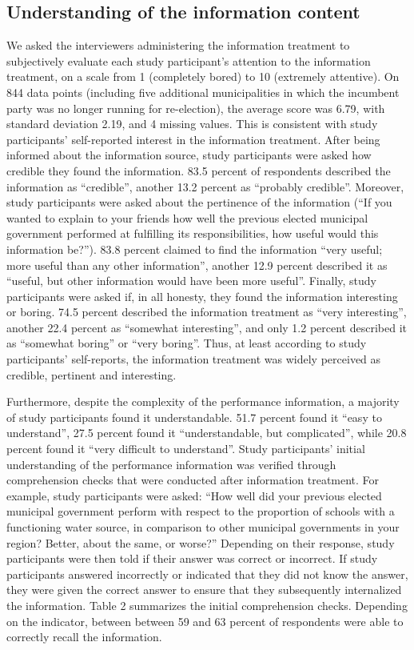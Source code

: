 \documentclass[11pt]{article}
\begin{document}
\subsection{Understanding of the information content}

We asked the interviewers administering the information treatment to subjectively evaluate each study participant's attention to the information treatment, on a scale from 1 (completely bored) to 10 (extremely attentive). On 844 data points (including five additional municipalities in which the incumbent party was no longer running for re-election), the average score was 6.79, with standard deviation 2.19, and 4 missing values. This is consistent with study participants' self-reported interest in the information treatment. After being informed about the information source, study participants were asked how credible they found the information. 83.5 percent of respondents described the information as ``credible'', another 13.2 percent as ``probably credible''. Moreover, study participants were asked about the pertinence of the information (``If you wanted to explain to your friends how well the previous elected municipal government performed at fulfilling its responsibilities, how useful would this information be?''). 83.8 percent claimed to find the information ``very useful; more useful than any other information'', another 12.9 percent described it as ``useful, but other information would have been more useful''. Finally, study participants were asked if, in all honesty, they found the information interesting or boring. 74.5 percent described the information treatment as ``very interesting'', another 22.4 percent as ``somewhat interesting'', and only 1.2 percent described it as ``somewhat boring'' or ``very boring''. Thus, at least according to study participants' self-reports, the information treatment was widely perceived as credible, pertinent and interesting. 

Furthermore, despite the complexity of the performance information, a majority of study participants found it understandable. 51.7 percent found it ``easy to understand'', 27.5 percent found it ``understandable, but complicated'', while 20.8 percent found it ``very difficult to understand''. Study participants' initial understanding of the performance information was verified through comprehension checks that were conducted after information treatment. For example, study participants were asked: ``How well did your previous elected municipal government perform with respect to the proportion of schools with a functioning water source, in comparison to other municipal governments in your region? Better, about the same, or worse?'' Depending on their response, study participants were then told if their answer was correct or incorrect. If study participants answered incorrectly or indicated that they did not know the answer, they were given the correct answer to ensure that they subsequently internalized the information. Table 2 summarizes the initial comprehension checks. Depending on the indicator, between between 59 and 63 percent of respondents were able to correctly recall the information. 
\end{document}
